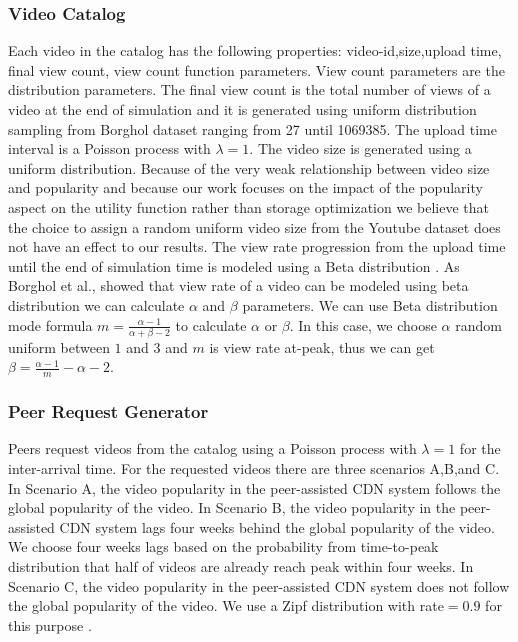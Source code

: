\documentclass[10pt,final,journal,a4paper]{IEEEtran}
\begin{document}
\subsubsection{Video Catalog}\label{catalog}
Each video in the catalog has the following properties: 
video-id,size,upload time, final view count, view count function parameters. 
View count parameters are the distribution parameters.
The final view count is the total number of views of a video at the end of simulation and it is generated using uniform distribution sampling from Borghol dataset ranging from 27 until 1069385.
The upload time interval is a Poisson process with $\lambda=1$.
The video size is generated using a uniform distribution.
Because of the very weak relationship between video size and popularity \cite{abhari2010workload} and because our work focuses on the impact of the popularity aspect on the utility function rather than storage optimization we believe that the choice to assign a random uniform video size from the Youtube dataset does not have an effect to our results. 
The view rate progression from the upload time until the end of simulation time is modeled using a Beta distribution \cite{Borghol:2011:CMP:2039452.2039717}.
As Borghol et al.,\cite{Borghol:2011:CMP:2039452.2039717} showed that view rate of a video can be modeled using beta distribution we can calculate $\alpha$ and $\beta$ parameters.
We can use Beta distribution mode formula $m=\frac{\alpha-1}{\alpha+\beta-2}$ to calculate $\alpha$ or $\beta$. 
In this case, we choose $\alpha$ random uniform between $1$ and $3$ and $m$ is view rate at-peak, thus we can get $\beta=\frac{\alpha-1}{m}-\alpha-2$.


\subsubsection{Peer Request Generator}\label{peerrequest}
Peers request videos from the catalog using a Poisson process with $\lambda=1$ \cite{Zink:2009:CYN:1502814.1502987} for the inter-arrival time.
For the requested videos there are three scenarios A,B,and C.
In Scenario A, the video popularity in the peer-assisted CDN system follows the global popularity of the video.
In Scenario B, the video popularity in the peer-assisted CDN system lags four weeks behind the global popularity of the video. 
We choose four weeks lags based on the probability from time-to-peak distribution that half of videos are already reach peak within four weeks.
In Scenario C, the video popularity in the peer-assisted CDN system does not follow the global popularity of the video. 
We use a Zipf distribution with rate$=0.9$ for this purpose \cite{6654887}.
\end{document}
